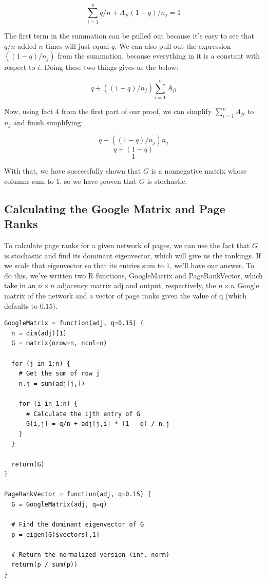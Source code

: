 \documentclass{article}
\begin{document}
$$
\sum_{i=1}^n q/n + A_{ji} (1 - q) / n_j = 1
$$

The first term in the summation can be pulled out because it's easy to see that $q/n$
added $n$ times will just equal $q$. We can also pull out the expression
$((1 - q) / n_j)$ from the summation, because everything in it is a constant with
respect to $i$. Doing these two things gives us the below:

$$
q +  ((1 - q) / n_j) \sum_{i=1}^n A_{ji}
$$

Now, using fact 4 from the first part of our proof, we can simplify $\sum_{i=1}^n A_{ji}$
to $n_j$ and finish simplifying:

$$
q +  ((1 - q) / n_j) n_j
$$
$$
q + (1 - q)
$$
$$
1
$$

With that, we have successfully shown that $G$ is a nonnegative matrix whose columns sum
to $1$, so we have proven that $G$ is stochastic.

\subsection{Calculating the Google Matrix and Page Ranks}

To calculate page ranks for a given network of pages, we can use the fact that $G$ is
stochastic and find its dominant eigenvector, which will give us the rankings. If we
scale that eigenvector so that its entries sum to $1$, we'll have our answer. To do
this, we've written two R functions, GoogleMatrix and PageRankVector,
which take in an $n \times n$ adjacency matrix adj and output, respectively,
the $n \times n$ Google matrix of the network and a vector of page ranks given the value
of q (which defaults to $0.15$).

\begin{verbatim}
GoogleMatrix = function(adj, q=0.15) {
  n = dim(adj)[1]
  G = matrix(nrow=n, ncol=n)
  
  for (j in 1:n) {
    # Get the sum of row j
    n.j = sum(adj[j,])
    
    for (i in 1:n) {
      # Calculate the ijth entry of G
      G[i,j] = q/n + adj[j,i] * (1 - q) / n.j
    }
  }
  
  return(G)
}

PageRankVector = function(adj, q=0.15) {
  G = GoogleMatrix(adj, q=q)
  
  # Find the dominant eigenvector of G
  p = eigen(G)$vectors[,1]
  
  # Return the normalized version (inf. norm)
  return(p / sum(p))
}
\end{verbatim}
\end{document}
